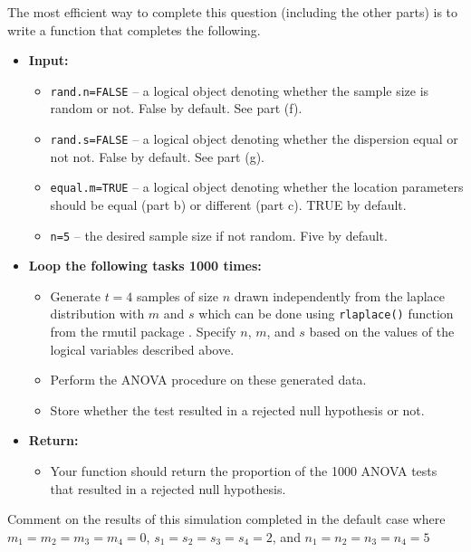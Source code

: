 \documentclass{article}\usepackage[]{graphicx}\usepackage[]{color}
\begin{document}
\begin{enumerate}
\begin{enumerate}
  The most efficient way to complete this question (including the other parts)
  is to write a function that completes the following. 
  \begin{itemize}
    \item \textbf{Input:} 
    \begin{itemize}
      \item \texttt{rand.n=FALSE} -- a logical object denoting whether the sample
                                     size is random or not. False by default.
                                     See part (f).
      \item \texttt{rand.s=FALSE} -- a logical object denoting whether the dispersion
                                     equal or not not. False by default. See part (g).
      \item \texttt{equal.m=TRUE} -- a logical object denoting whether the location
                                     parameters should be equal (part b) or different 
                                     (part c). TRUE by default. 
      \item \texttt{n=5} -- the desired sample size if not random. Five by default.
    \end{itemize}
    \item \textbf{Loop the following tasks 1000 times:}
    \begin{itemize}
      \item Generate $t=4$ samples of size $n$ drawn independently from the 
        laplace distribution with $m$ and $s$ which can be done using 
        \texttt{rlaplace()} function from the rmutil package \citep{rmutil}. Specify
        $n$, $m$, and $s$ based on the values of the
        logical variables described above.
      \item Perform the ANOVA procedure on these generated data.
      \item Store whether the test resulted in a rejected null hypothesis or not.
    \end{itemize}
    \item \textbf{Return:}
    \begin{itemize}
      \item Your function should return the proportion of the 1000 ANOVA tests
      that resulted in a rejected null hypothesis.
    \end{itemize}
  \end{itemize}
    Comment on the results of this simulation completed in the default case where
  $m_1=m_2=m_3=m_4=0$, $s_1=s_2=s_3=s_4=2$, and $n_1=n_2=n_3=n_4=5$

\end{enumerate}
\end{enumerate}
\end{document}
